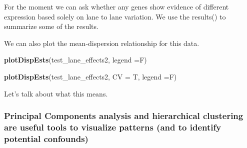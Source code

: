 \documentclass[
]{article}
\newenvironment{Shaded}{\begin{snugshade}}{\end{snugshade}}
\newcommand{\CommentTok}[1]{\textcolor[rgb]{0.56,0.35,0.01}{\textit{#1}}}
\newcommand{\DataTypeTok}[1]{\textcolor[rgb]{0.13,0.29,0.53}{#1}}
\newcommand{\FloatTok}[1]{\textcolor[rgb]{0.00,0.00,0.81}{#1}}
\newcommand{\KeywordTok}[1]{\textcolor[rgb]{0.13,0.29,0.53}{\textbf{#1}}}
\newcommand{\NormalTok}[1]{#1}
\newcommand{\OperatorTok}[1]{\textcolor[rgb]{0.81,0.36,0.00}{\textbf{#1}}}
\newcommand{\StringTok}[1]{\textcolor[rgb]{0.31,0.60,0.02}{#1}}
\begin{document}
For the moment we can ask whether any genes show evidence of different
expression based solely on lane to lane variation. We use the results()
to summarize some of the results.

\begin{Shaded}
\end{Shaded}

We can also plot the mean-dispersion relationship for this data.

\begin{Shaded}
\begin{Highlighting}[]
\KeywordTok{plotDispEsts}\NormalTok{(test_lane_effects2, }
             \DataTypeTok{legend =}\NormalTok{F)}

\KeywordTok{plotDispEsts}\NormalTok{(test_lane_effects2, }
             \DataTypeTok{CV =}\NormalTok{ T, }\DataTypeTok{legend =}\NormalTok{F)}
\end{Highlighting}
\end{Shaded}

Let's talk about what this means.

\hypertarget{principal-components-analysis-and-hierarchical-clustering-are-useful-tools-to-visualize-patterns-and-to-identify-potential-confounds}{%
\subsubsection{Principal Components analysis and hierarchical clustering
are useful tools to visualize patterns (and to identify potential
confounds)}\label{principal-components-analysis-and-hierarchical-clustering-are-useful-tools-to-visualize-patterns-and-to-identify-potential-confounds}}
\end{document}
